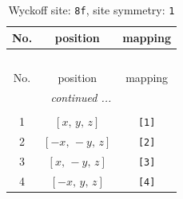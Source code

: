 \documentclass[fleqn,8pt]{jsarticle}
\begin{document}
\renewcommand{\arraystretch}{1.2}
\begin{longtable}{ccc}
\caption{Wyckoff site: {\tt 8f}, site symmetry: {\tt 1}}
 \\
 \hline \hline
No. & position & mapping \\ \hline \endfirsthead

\multicolumn{2}{l}{\tablename\ \thetable{}} \\
 \hline \hline
No. & position & mapping \\ \hline \endhead

 \hline \hline
\multicolumn{2}{r}{\footnotesize\it continued ...} \\ \endfoot

 \hline \hline
\multicolumn{2}{r}{} \\ \endlastfoot

1 & $\left[ x,\, y,\, z \right]$ & {\tt [1]} \\ \hline
2 & $\left[ - x,\, - y,\, z \right]$ & {\tt [2]} \\ \hline
3 & $\left[ x,\, - y,\, z \right]$ & {\tt [3]} \\ \hline
4 & $\left[ - x,\, y,\, z \right]$ & {\tt [4]} \\
\end{longtable}
\end{document}
